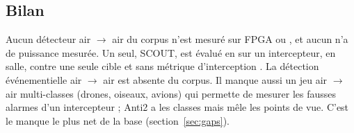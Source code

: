 \subsection{Bilan}

Aucun détecteur air $\rightarrow$ air du corpus n'est mesuré sur  FPGA ou , et
aucun n'a de puissance mesurée. Un seul, SCOUT, est évalué en  sur un
intercepteur, en salle, contre une seule cible et sans métrique d'interception
\citep[§IV-D]{arxiv-2609.21005-project-scout-interceptor-drone-perimeter}\pp. La détection
événementielle air $\rightarrow$ air est absente du corpus.
Il manque aussi un jeu air $\rightarrow$ air multi-classes (drones, oiseaux, avions) qui
permette de mesurer les fausses alarmes d'un intercepteur ; Anti2
\citep{2024-gao-dataset-detection-method-unmanned-aerial} a les classes mais mêle les
points de vue. C'est le manque le plus net de la base (section~\ref{sec:gaps}).
